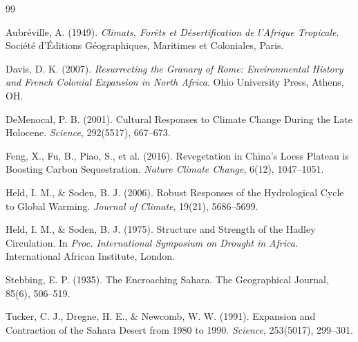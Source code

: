 \documentclass[12pt,a4paper]{article}
\begin{document}
\begin{thebibliography}{99}

Aubréville, A. (1949). \textit{Climats, Forêts et Désertification de l'Afrique Tropicale}. Société d'Éditions Géographiques, Maritimes et Coloniales, Paris.

Davis, D. K. (2007). \textit{Resurrecting the Granary of Rome: Environmental History and French Colonial Expansion in North Africa}. Ohio University Press, Athens, OH.

DeMenocal, P. B. (2001). Cultural Responses to Climate Change During the Late Holocene. \textit{Science}, 292(5517), 667–673.

Feng, X., Fu, B., Piao, S., et al. (2016). Revegetation in China's Loess Plateau is Boosting Carbon Sequestration. \textit{Nature Climate Change}, 6(12), 1047–1051.

Held, I. M., \& Soden, B. J. (2006). Robust Responses of the Hydrological Cycle to Global Warming. \textit{Journal of Climate}, 19(21), 5686–5699.

Held, I. M., \& Soden, B. J. (1975). Structure and Strength of the Hadley Circulation. In \textit{Proc. International Symposium on Drought in Africa}. International African Institute, London.

Stebbing, E. P. (1935). The Encroaching Sahara. The Geographical Journal, 85(6), 506–519.

Tucker, C. J., Dregne, H. E., \& Newcomb, W. W. (1991). Expansion and Contraction of the Sahara Desert from 1980 to 1990. \textit{Science}, 253(5017), 299–301.

\end{thebibliography}
\end{document}
